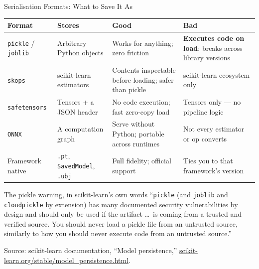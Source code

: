 
\begin{frame}{Serialisation Formats: What to Save It As}

    \centering
    \renewcommand{\arraystretch}{1.25}
    {\scriptsize
    \begin{tabular}{p{2.0cm}|p{3.2cm}|p{3.0cm}|p{3.0cm}}
        \toprule
        \textbf{Format} & \textbf{Stores} & \textbf{Good} & \textbf{Bad} \\
        \midrule
        \texttt{pickle} / \texttt{joblib} & Arbitrary Python objects &
            Works for anything; zero friction & \textbf{Executes code on load}; breaks across library versions \\
        \texttt{skops} & scikit-learn estimators &
            Contents inspectable before loading; safer than pickle & scikit-learn ecosystem only \\
        \texttt{safetensors} & Tensors + a JSON header &
            No code execution; fast zero-copy load & Tensors only --- no pipeline logic \\
        \texttt{ONNX} & A computation graph &
            Serve without Python; portable across runtimes & Not every estimator or op converts \\
        Framework native & \texttt{.pt}, \texttt{SavedModel}, \texttt{.ubj} &
            Full fidelity; official support & Ties you to that framework's version \\
        \bottomrule
    \end{tabular}}

    \vspace{0.7em}
    \begin{alertblock}{The pickle warning, in scikit-learn's own words}
        \small ``\texttt{pickle} (and \texttt{joblib} and \texttt{cloudpickle} by extension) has many
        documented security vulnerabilities by design and should only be used if the artifact \ldots\ is
        coming from a trusted and verified source. You should never load a pickle file from an untrusted
        source, similarly to how you should never execute code from an untrusted source.''
    \end{alertblock}

    \vspace{0.3em}
    {\scriptsize Source: scikit-learn documentation, ``Model persistence,''
    \href{https://scikit-learn.org/stable/model_persistence.html}{scikit-learn.org/stable/model\_persistence.html}.}

\end{frame}
